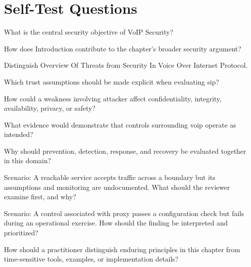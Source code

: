 \documentclass[11pt,letterpaper]{article}
\begin{document}
\section*{Self-Test Questions}
\begin{CornellRecallList}
\item What is the central security objective of VoIP Security?
\item How does Introduction contribute to the chapter's broader security argument?
\item Distinguish Overview Of Threats from Security In Voice Over Internet Protocol.
\item Which trust assumptions should be made explicit when evaluating sip?
\item How could a weakness involving attacker affect confidentiality, integrity, availability, privacy, or safety?
\item What evidence would demonstrate that controls surrounding voip operate as intended?
\item Why should prevention, detection, response, and recovery be evaluated together in this domain?
\item Scenario: A reachable service accepts traffic across a boundary but its assumptions and monitoring are undocumented. What should the reviewer examine first, and why?
\item Scenario: A control associated with proxy passes a configuration check but fails during an operational exercise. How should the finding be interpreted and prioritized?
\item How should a practitioner distinguish enduring principles in this chapter from time-sensitive tools, examples, or implementation details?
\end{CornellRecallList}
\end{document}
